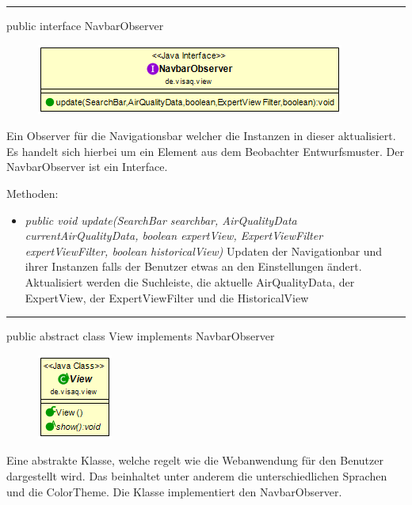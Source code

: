 \rule{\textwidth}{0.4pt}
public interface NavbarObserver

\begin{minipage}{0.4\textwidth}
    \begin{figure}[H]
        \includegraphics[scale = 0.5]{media/frontend/view/de.view/NavbarObserver_Class.png}
    \end{figure}
\end{minipage} \hfill
\begin{minipage}{0.5\textwidth}
    Ein Observer für die Navigationsbar welcher die Instanzen in dieser aktualisiert. Es handelt sich hierbei um ein Element aus dem Beobachter Entwurfsmuster. Der NavbarObserver ist ein Interface.
\end{minipage}

Methoden:
\begin{itemize} 
    \item \emph{public void update(SearchBar searchbar, AirQualityData currentAirQualityData,
    boolean expertView, ExpertViewFilter expertViewFilter, boolean historicalView)} Updaten der Navigationbar und ihrer Instanzen falls der Benutzer etwas an den Einstellungen ändert. Aktualisiert werden die Suchleiste, die aktuelle AirQualityData, der ExpertView, der ExpertViewFilter und die HistoricalView
\end{itemize}

\rule{\textwidth}{0.4pt}
public abstract class View implements NavbarObserver

\begin{minipage}{0.3\textwidth}
    \begin{figure}[H]
        \includegraphics[scale = 0.7]{media/frontend/view/de.view/View_Class.png}
    \end{figure}
\end{minipage} \hfill
\begin{minipage}{0.7\textwidth}
    Eine abstrakte Klasse, welche regelt wie die Webanwendung für den Benutzer dargestellt wird. Das beinhaltet unter anderem die unterschiedlichen Sprachen und die ColorTheme. Die Klasse implementiert den NavbarObserver.
\end{minipage}

